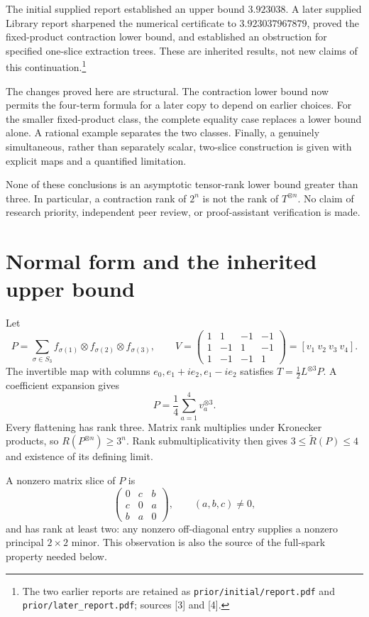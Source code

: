 \documentclass[11pt,letterpaper]{article}
\theoremstyle{definition}\newtheorem{definition}[theorem]{Definition}
\theoremstyle{remark}\newtheorem{remark}[theorem]{Remark}
\newcommand{\AR}{\widetilde R}
\begin{document}
The initial supplied report established an upper bound $3.923038$. A later supplied Library report sharpened the numerical certificate to $3.923037967879$, proved the fixed-product contraction lower bound, and established an obstruction for specified one-slice extraction trees. These are inherited results, not new claims of this continuation.\footnote{The two earlier reports are retained as \texttt{prior/initial/report.pdf} and \texttt{prior/later\_report.pdf}; sources [3] and [4].}

The changes proved here are structural. The contraction lower bound now permits the four-term formula for a later copy to depend on earlier choices. For the smaller fixed-product class, the complete equality case replaces a lower bound alone. A rational example separates the two classes. Finally, a genuinely simultaneous, rather than separately scalar, two-slice construction is given with explicit maps and a quantified limitation.

None of these conclusions is an asymptotic tensor-rank lower bound greater than three. In particular, a contraction rank of $2^n$ is not the rank of $T^{\otimes n}$. No claim of research priority, independent peer review, or proof-assistant verification is made.

\section{Normal form and the inherited upper bound}
Let
\[
P=\sum_{\sigma\in S_3}f_{\sigma(1)}\otimes f_{\sigma(2)}\otimes f_{\sigma(3)},
\qquad
V=\begin{pmatrix}1&1&-1&-1\\1&-1&1&-1\\1&-1&-1&1\end{pmatrix}
=[v_1\ v_2\ v_3\ v_4].
\]
The invertible map with columns $e_0,e_1+ie_2,e_1-ie_2$ satisfies $T=\frac12L^{\otimes3}P$. A coefficient expansion gives
\begin{equation}\label{eq:four}
P=\frac14\sum_{a=1}^{4}v_a^{\otimes3}.
\end{equation}
Every flattening has rank three. Matrix rank multiplies under Kronecker products, so $R(P^{\otimes n})\geq3^n$. Rank submultiplicativity then gives $3\leq\AR(P)\leq4$ and existence of its defining limit.

A nonzero matrix slice of $P$ is
\begin{equation}\label{eq:slice}
\begin{pmatrix}0&c&b\\c&0&a\\b&a&0\end{pmatrix},\qquad (a,b,c)\ne0,
\end{equation}
and has rank at least two: any nonzero off-diagonal entry supplies a nonzero principal $2\times2$ minor. This observation is also the source of the full-spark property needed below.
\end{document}
